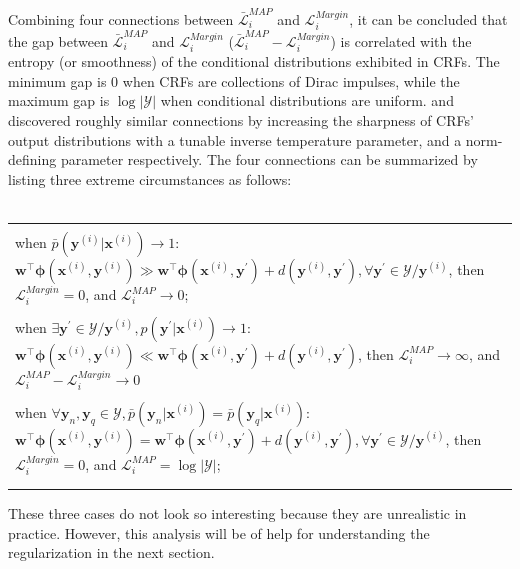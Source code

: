 Combining four connections between $\bar{\mathcal{L}}^{MAP}_i$ and $\mathcal{L}^{Margin}_i$, it can be concluded that the gap between $\bar{\mathcal{L}}^{MAP}_i$ and $\mathcal{L}^{Margin}_i$ ($\bar{\mathcal{L}}^{MAP}_i-\mathcal{L}^{Margin}_i$) is correlated 
with the entropy (or smoothness) of the 
conditional distributions exhibited in CRFs. The minimum gap is 0 when CRFs are collections of Dirac impulses, while the maximum gap is $\log|\mathcal{Y}|$ when conditional distributions 
are uniform.  
\cite{MaxEnt} and \cite{Norm_Partition} discovered roughly similar connections by increasing the sharpness of CRFs' output distributions with a tunable inverse temperature parameter, and a norm-defining 
parameter respectively. The four connections can be summarized by listing three extreme circumstances as follows: \\ \\
\begin{tabular}{m{15cm}}
      \Xhline{3\arrayrulewidth} \\ 
      when $\bar p(\mathbf{y}^{(i)}|\mathbf{x}^{(i)})\to 1$: $\mathbf{w}^\top \boldsymbol\phi(\mathbf{x}^{(i)},\mathbf{y}^{(i)})\gg \mathbf{w}^\top \boldsymbol\phi(\mathbf{x}^{(i)},\mathbf{y}^\prime)
        +d(\mathbf{y}^{(i)},\mathbf{y}^\prime), 
        \forall \mathbf{y}^\prime\in\mathcal{Y}/\mathbf{y}^{(i)}$, then $\mathcal{L}_i^{Margin}=0$, and $\mathcal{L}_i^{MAP}\to 0$;  \\ \\
      when $\exists \mathbf{y}^\prime\in\mathcal{Y}/\mathbf{y}^{(i)}, p(\mathbf{y}^\prime|\mathbf{x}^{(i)})\to 1$: $\mathbf{w}^\top \boldsymbol\phi(\mathbf{x}^{(i)},\mathbf{y}^{(i)})\ll \mathbf{w}^\top \boldsymbol\phi(\mathbf{x}^{(i)},\mathbf{y}^\prime)
        +d(\mathbf{y}^{(i)},\mathbf{y}^\prime)$, then $\mathcal{L}_i^{MAP}\to \infty$, and $\mathcal{L}_i^{MAP}-\mathcal{L}_i^{Margin}\to 0$ \\
      \Xhline{3\arrayrulewidth} \\
when $\forall \mathbf{y}_n, \mathbf{y}_q\in\mathcal{Y}, \bar p(\mathbf{y}_n|\mathbf{x}^{(i)})=\bar p(\mathbf{y}_q|\mathbf{x}^{(i)})$: $\mathbf{w}^\top \boldsymbol\phi(\mathbf{x}^{(i)},
        \mathbf{y}^{(i)})=\mathbf{w}^\top \boldsymbol\phi(\mathbf{x}^{(i)},\mathbf{y}^\prime)
        +d(\mathbf{y}^{(i)},\mathbf{y}^\prime), 
        \forall \mathbf{y}^\prime\in\mathcal{Y}/\mathbf{y}^{(i)}$, then $\mathcal{L}_i^{Margin}=0$, and $\mathcal{L}_i^{MAP}=\log |\mathcal{Y}|$;  \\ \\
\Xhline{3\arrayrulewidth}
\end{tabular}
\newline 
\newline 
These three cases do not look so interesting because they are unrealistic in practice.
However, this analysis will be of help for understanding the regularization in the next section.   


